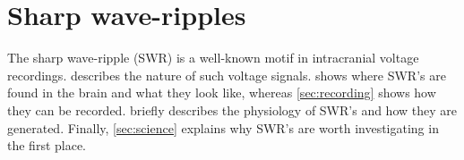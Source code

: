 \chapter{Sharp wave-ripples}
\label{ch:SWR}

The sharp wave-ripple (SWR) is a well-known motif in intracranial voltage recordings.  describes the nature of such voltage signals.  shows where SWR's are found in the brain and what they look like, whereas \cref{sec:recording} shows how they can be recorded.  briefly describes the physiology of SWR's and how they are generated. Finally, \cref{sec:science} explains why SWR's are worth investigating in the first place.






